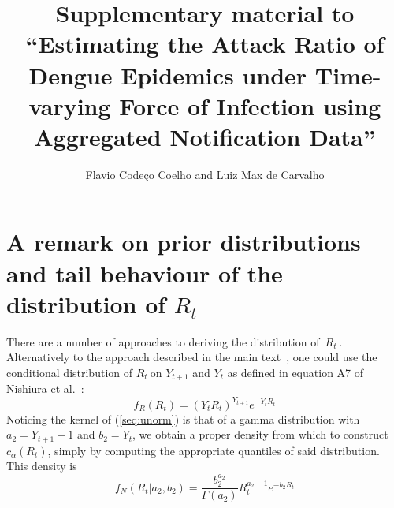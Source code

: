 \documentclass[a4paper,10pt]{article}
\title{Supplementary material to ``Estimating the Attack Ratio of Dengue 
Epidemics under Time-varying 
Force of Infection using Aggregated Notification Data''}
\author{Flavio Code\c{c}o Coelho and Luiz Max de Carvalho}
\def \rr {$R_{t}\:$}
\begin{document}
\maketitle

\section*{A remark on prior distributions and tail behaviour of the 
distribution of $R_t$}
\label{sec:tails}
There are a number of approaches to deriving the distribution of~\rr.
Alternatively to the approach described in the main text~\citep{mantel}, one 
could use the conditional distribution of \rr on 
$Y_{t+1}$ and $Y_t$ as defined in equation A7 of Nishiura et 
al.~\citep{nishiura}:
\begin{equation}
\label{seq:unorm}
f_{R}(R_{t}) = (Y_tR_{t})^{Y_{t+1}} e^{-Y_tR_{t}}
\end{equation}
Noticing the kernel of (\ref{seq:unorm}) is that of a gamma distribution with 
$a_2 = Y_{t+1}+1$ and $b_2 = Y_t$, we obtain a proper density from which to 
construct $c_{\alpha}(R_t)$, simply by computing the appropriate quantiles of 
said distribution.
 This density is
\begin{equation}
\label{seq:densityNishiura}
f_N(R_t| a_2, b_2) =  \frac{b_2^{a_2}}{\Gamma(a_2)} R_t^{a_2-1} e^{-b_2 R_t}
\end{equation}
\end{document}
